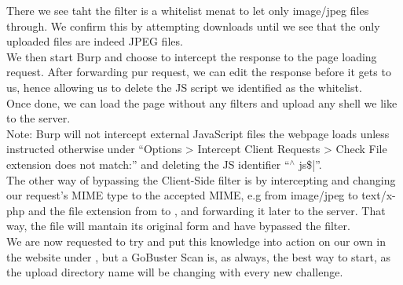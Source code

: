 {There we see taht the filter is a whitelist menat to let only image/jpeg files through. We confirm this by attempting downloads until we see that the only uploaded files are indeed JPEG files.\\
We then start Burp and choose to intercept the response to the page loading request. After forwarding pur request, we can edit the response before it gets to us, hence allowing us to delete the JS script we identified as the whitelist.\\
Once done, we can load the page without any filters and upload any shell we like to the server.\\
Note: Burp will not intercept external JavaScript files the webpage loads unless instructed otherwise under ``Options > Intercept Client Requests > Check File extension does not match:'' and deleting the JS identifier ``$^\wedge$ js\$|''.\\

The other way of bypassing the Client-Side filter is by intercepting and changing our request's MIME type to the accepted MIME, e.g from image/jpeg to text/x-php and the file extension from  to , and forwarding it later to the server. That way, the file will mantain its original form and have bypassed the filter.\\

We are now requested to try and put this knowledge into action on our own in the website under , but a GoBuster Scan is, as always, the best way to start, as the upload directory name will be changing with every new challenge.\\
}

